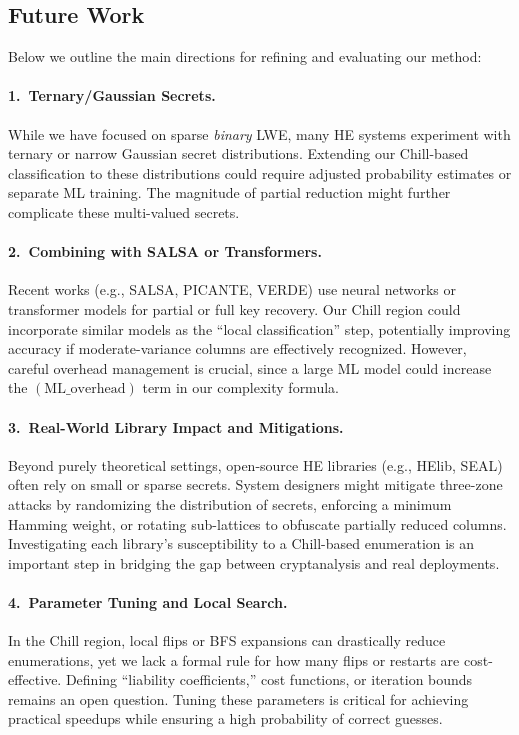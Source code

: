 \documentclass[conference]{IEEEtran}
\begin{document}
\subsection{Future Work}
Below we outline the main directions for refining and evaluating our method:

\paragraph{1.\ Ternary/Gaussian Secrets.}
While we have focused on sparse \emph{binary} LWE, many HE systems experiment with ternary or narrow Gaussian secret distributions. Extending our Chill-based classification to these distributions could require adjusted probability estimates or separate ML training. The magnitude of partial reduction might further complicate these multi-valued secrets.

\paragraph{2.\ Combining with SALSA or Transformers.}
Recent works (e.g., SALSA, PICANTE, VERDE) use neural networks or transformer models for partial or full key recovery. Our Chill region could incorporate similar models as the “local classification” step, potentially improving accuracy if moderate-variance columns are effectively recognized. However, careful overhead management is crucial, since a large ML model could increase the $(\mathrm{ML\_overhead})$ term in our complexity formula.

\paragraph{3.\ Real-World Library Impact and Mitigations.}
Beyond purely theoretical settings, open-source HE libraries (e.g., HElib, SEAL) often rely on small or sparse secrets. System designers might mitigate three-zone attacks by randomizing the distribution of secrets, enforcing a minimum Hamming weight, or rotating sub-lattices to obfuscate partially reduced columns. Investigating each library’s susceptibility to a Chill-based enumeration is an important step in bridging the gap between cryptanalysis and real deployments.

\paragraph{4.\ Parameter Tuning and Local Search.}
In the Chill region, local flips or BFS expansions can drastically reduce enumerations, yet we lack a formal rule for how many flips or restarts are cost-effective. Defining “liability coefficients,” cost functions, or iteration bounds remains an open question. Tuning these parameters is critical for achieving practical speedups while ensuring a high probability of correct guesses.
\end{document}
